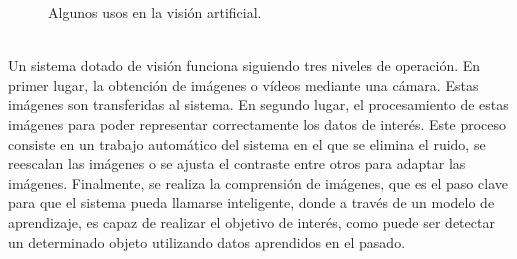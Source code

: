 \begin{figure}[h!]
  \begin{center}
    \hspace{8mm}
    \hspace{8mm}
  \end{center}
\caption[]{Algunos usos en la visión artificial.\footnotemark} \label{fig:vision}
\end{figure}\\

Un sistema dotado de visión funciona siguiendo tres niveles de operación. En primer lugar, la obtención de imágenes o vídeos mediante una cámara. Estas imágenes son transferidas al sistema. En segundo lugar, el procesamiento de estas imágenes para poder representar correctamente los datos de interés. Este proceso consiste en un trabajo automático del sistema en el que se elimina el ruido, se reescalan las imágenes o se ajusta el contraste entre otros para adaptar las imágenes. Finalmente, se realiza la comprensión de imágenes, que es el paso clave para que el sistema pueda llamarse inteligente, donde a través de un modelo de aprendizaje, es capaz de realizar el objetivo de interés, como puede ser detectar un determinado objeto utilizando datos aprendidos en el pasado.\\

